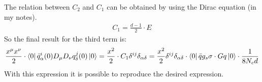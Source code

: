 \documentclass[openright,twoside,12pt,a4paper,final]{article}
\begin{document}
	The relation between $C_2$ and $C_1$ can be obtained by using the Dirac equation (in my notes).
	\begin{align}
		C_1 = \frac{d - 1}{2} \cdot E
	\end{align}
	So the final result for the third term is:
	\begin{align}
		\frac{x^{\mu} x^{\nu}}{2} \cdot \bra{0}\bar{q}^{i}_{\alpha}(0) D_{\mu} D_{\nu} q^{j}_{\delta}(0) \ket{0} = \frac{x^2}{2} \cdot C_1 \delta^{ij} \delta_{\alpha \delta} = \frac{x^2}{2} \delta^{ij} \delta_{\alpha \delta} \cdot \bra{0} \bar{q} g_s \sigma \cdot G q \ket{0} \cdot \frac{1}{8 N_c d}
	\end{align}
	With this expression it is possible to reproduce the desired expression.
    
\end{document}
